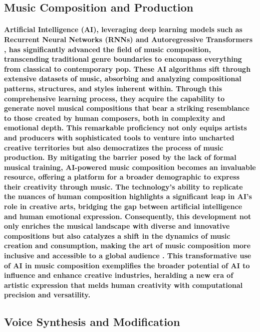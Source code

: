 \documentclass[11pt,a4paper,oneside]{report}
\begin{document}
\subsection{Music Composition and Production}
\paragraph{Artificial Intelligence (AI), leveraging deep learning models such as Recurrent Neural Networks (RNNs) \cite{srivastava2015unsupervised} \cite{chiappa2017recurrent} \cite{ha2018world} and Autoregressive Transformers \cite{yan2021videogpt} \cite{wu2022nuwa}, has significantly advanced the field of music composition, transcending traditional genre boundaries to encompass everything from classical to contemporary pop. These AI algorithms sift through extensive datasets of music, absorbing and analyzing compositional patterns, structures, and styles inherent within. Through this comprehensive learning process, they acquire the capability to generate novel musical compositions that bear a striking resemblance to those created by human composers, both in complexity and emotional depth. This remarkable proficiency not only equips artists and producers with sophisticated tools to venture into uncharted creative territories but also democratizes the process of music production. By mitigating the barrier posed by the lack of formal musical training, AI-powered music composition becomes an invaluable resource, offering a platform for a broader demographic to express their creativity through music. The technology's ability to replicate the nuances of human composition highlights a significant leap in AI's role in creative arts, bridging the gap between artificial intelligence and human emotional expression. Consequently, this development not only enriches the musical landscape with diverse and innovative compositions but also catalyzes a shift in the dynamics of music creation and consumption, making the art of music composition more inclusive and accessible to a global audience \cite{briot2021artificial}. This transformative use of AI in music composition exemplifies the broader potential of AI to influence and enhance creative industries, heralding a new era of artistic expression that melds human creativity with computational precision and versatility.}

\subsection{Voice Synthesis and Modification}
\end{document}
